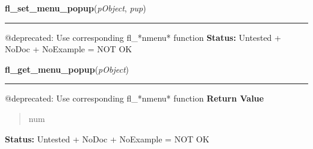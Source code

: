     \vspace{0.5ex}

\hspace{.8\funcindent}\begin{boxedminipage}{\funcwidth}

    \raggedright \textbf{fl\_set\_menu\_popup}(\textit{pObject}, \textit{pup})

    \vspace{-1.5ex}

    \rule{\textwidth}{0.5\fboxrule}
\setlength{\parskip}{2ex}

@deprecated: Use corresponding fl\_*nmenu* function
\setlength{\parskip}{1ex}
\textbf{Status:} 
Untested + NoDoc + NoExample = NOT OK


    \end{boxedminipage}

    \label{xformslib:deprecated:fl_get_menu_popup}

    \vspace{0.5ex}

\hspace{.8\funcindent}\begin{boxedminipage}{\funcwidth}

    \raggedright \textbf{fl\_get\_menu\_popup}(\textit{pObject})

    \vspace{-1.5ex}

    \rule{\textwidth}{0.5\fboxrule}
\setlength{\parskip}{2ex}

@deprecated: Use corresponding fl\_*nmenu* function
\setlength{\parskip}{1ex}
      \textbf{Return Value}
    \vspace{-1ex}

      \begin{quote}

num
      \end{quote}

\textbf{Status:} 
Untested + NoDoc + NoExample = NOT OK


    \end{boxedminipage}

    \label{xformslib:deprecated:fl_get_menu}

    \vspace{0.5ex}

